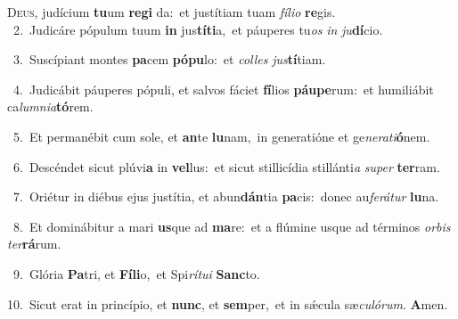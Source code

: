 \lettrine{\initial\textcolor{\initialcolor}{D}}{eus,} judícium \textbf{tu}\-um \textbf{re}\-\textbf{gi} da:~\star et justítiam tuam \textit{fí}\-\textit{li}\textit{o} \textbf{re}\-gis.\\
{\numbfont\textcolor{\numbcolor}{~2.}}~Judicáre pópulum tuum \textbf{in} jus\-\textbf{tí}\-\textbf{ti}a,~\star et páuperes tu\textit{os} \textit{in} \textit{ju}\-\textbf{dí}cio.\par
{\numbfont\textcolor{\numbcolor}{~3.}}~Suscípiant montes \textbf{pa}\-cem \textbf{pó}\-\textbf{pu}lo:~\star et \textit{col}\-\textit{les} \textit{jus}\-\textbf{tí}tiam.\par
{\numbfont\textcolor{\numbcolor}{~4.}}~Judicábit páuperes pópuli, et salvos fáciet \textbf{fí}\-lios \textbf{páu}\-\textbf{pe}rum:~\star et humiliábit ca\-\textit{lum}\-\textit{ni}\textit{a}\textbf{tó}rem.\par
{\numbfont\textcolor{\numbcolor}{~5.}}~Et permanébit cum sole, et \textbf{an}\-te \textbf{lu}\-nam,~\star in generatióne et ge\-\textit{ne}\-\textit{ra}\textit{ti}\textbf{ó}nem.\par
{\numbfont\textcolor{\numbcolor}{~6.}}~Descéndet sicut plúvi\textbf{a} in \textbf{vel}\-lus:~\star et sicut stillicídia stillánti\textit{a} \textit{su}\-\textit{per} \textbf{ter}\-ram.\par
{\numbfont\textcolor{\numbcolor}{~7.}}~Oriétur in diébus ejus justítia, et abun\-\textbf{dán}\-tia \textbf{pa}\-cis:~\star donec au\-\textit{fe}\-\textit{rá}\textit{tur} \textbf{lu}\-na.\par
{\numbfont\textcolor{\numbcolor}{~8.}}~Et dominábitur a mari \textbf{us}\-que ad \textbf{ma}\-re:~\star et a flúmine usque ad términos \textit{or}\-\textit{bis} \textit{ter}\-\textbf{rá}rum.\par
{\numbfont\textcolor{\numbcolor}{~9.}}~Glória \textbf{Pa}\-tri, et \textbf{Fí}\-\textbf{li}o,~\star et Spi\-\textit{rí}\-\textit{tu}\textit{i} \textbf{Sanc}\-to.\par
{\numbfont\textcolor{\numbcolor}{10.}}~Sicut erat in princípio, et \textbf{nunc}\-, et \textbf{sem}\-per,~\star et in sǽcula sæ\-\textit{cu}\-\textit{ló}\textit{rum}. \textbf{A}\-men.\par
